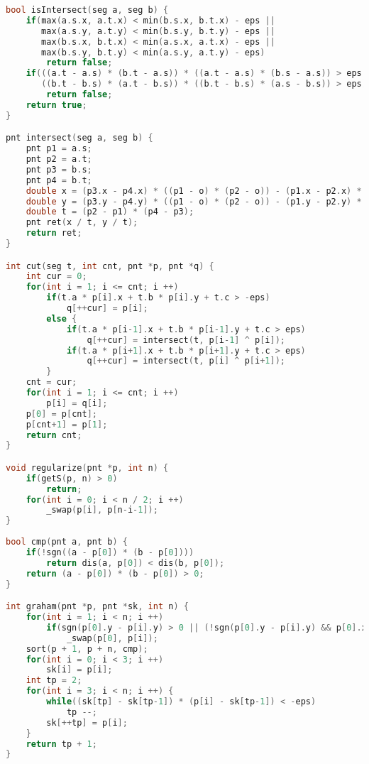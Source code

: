 \begin{lstlisting}[language=c++]
bool isIntersect(seg a, seg b) {
    if(max(a.s.x, a.t.x) < min(b.s.x, b.t.x) - eps ||
       max(a.s.y, a.t.y) < min(b.s.y, b.t.y) - eps ||
       max(b.s.x, b.t.x) < min(a.s.x, a.t.x) - eps ||
       max(b.s.y, b.t.y) < min(a.s.y, a.t.y) - eps)
        return false;
    if(((a.t - a.s) * (b.t - a.s)) * ((a.t - a.s) * (b.s - a.s)) > eps ||
       ((b.t - b.s) * (a.t - b.s)) * ((b.t - b.s) * (a.s - b.s)) > eps)
        return false;
    return true;
}

pnt intersect(seg a, seg b) {
    pnt p1 = a.s;
    pnt p2 = a.t;
    pnt p3 = b.s;
    pnt p4 = b.t;
    double x = (p3.x - p4.x) * ((p1 - o) * (p2 - o)) - (p1.x - p2.x) * ((p3 - o) * (p4 - o));
    double y = (p3.y - p4.y) * ((p1 - o) * (p2 - o)) - (p1.y - p2.y) * ((p3 - o) * (p4 - o));
    double t = (p2 - p1) * (p4 - p3);
    pnt ret(x / t, y / t);
    return ret;
}

int cut(seg t, int cnt, pnt *p, pnt *q) {
    int cur = 0;
    for(int i = 1; i <= cnt; i ++) 
        if(t.a * p[i].x + t.b * p[i].y + t.c > -eps)
            q[++cur] = p[i];
        else {
            if(t.a * p[i-1].x + t.b * p[i-1].y + t.c > eps)
                q[++cur] = intersect(t, p[i-1] ^ p[i]);
            if(t.a * p[i+1].x + t.b * p[i+1].y + t.c > eps)
                q[++cur] = intersect(t, p[i] ^ p[i+1]);
        }
    cnt = cur;
    for(int i = 1; i <= cnt; i ++)
        p[i] = q[i];
    p[0] = p[cnt];
    p[cnt+1] = p[1];
    return cnt;
}

void regularize(pnt *p, int n) {
    if(getS(p, n) > 0)
        return;
    for(int i = 0; i < n / 2; i ++)
        _swap(p[i], p[n-i-1]);
}
    
bool cmp(pnt a, pnt b) {
    if(!sgn((a - p[0]) * (b - p[0])))
        return dis(a, p[0]) < dis(b, p[0]);
    return (a - p[0]) * (b - p[0]) > 0;
}

int graham(pnt *p, pnt *sk, int n) {
    for(int i = 1; i < n; i ++)
        if(sgn(p[0].y - p[i].y) > 0 || (!sgn(p[0].y - p[i].y) && p[0].x > p[i].x))
            _swap(p[0], p[i]);
    sort(p + 1, p + n, cmp);
    for(int i = 0; i < 3; i ++)
        sk[i] = p[i];
    int tp = 2;
    for(int i = 3; i < n; i ++) {
        while((sk[tp] - sk[tp-1]) * (p[i] - sk[tp-1]) < -eps)
            tp --;
        sk[++tp] = p[i];
    }
    return tp + 1;
}
    \end{lstlisting}

